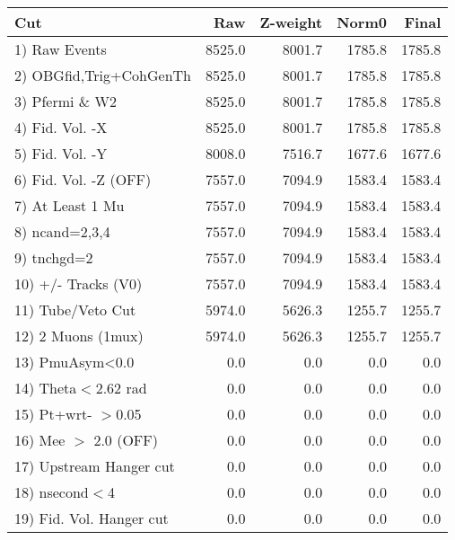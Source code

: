  \begin{table}[h!]\centering
 \begin{tabular}{||l||r|r|r|r||}
 \hline
 \hline
 Cut & Raw & Z-weight & Norm0 & Final \\
 \hline
  1) Raw Events           &      8525.0 &      8001.7 &      1785.8 &      1785.8 \\
  2) OBGfid,Trig+CohGenTh &      8525.0 &      8001.7 &      1785.8 &      1785.8 \\
  3) Pfermi \& W2         &      8525.0 &      8001.7 &      1785.8 &      1785.8 \\
  4) Fid. Vol. -X         &      8525.0 &      8001.7 &      1785.8 &      1785.8 \\
  5) Fid. Vol. -Y         &      8008.0 &      7516.7 &      1677.6 &      1677.6 \\
  6) Fid. Vol. -Z (OFF)   &      7557.0 &      7094.9 &      1583.4 &      1583.4 \\
  7) At Least 1 Mu        &      7557.0 &      7094.9 &      1583.4 &      1583.4 \\
  8) ncand=2,3,4          &      7557.0 &      7094.9 &      1583.4 &      1583.4 \\
  9) tnchgd=2             &      7557.0 &      7094.9 &      1583.4 &      1583.4 \\
 10) +/- Tracks (V0)      &      7557.0 &      7094.9 &      1583.4 &      1583.4 \\
 11) Tube/Veto Cut        &      5974.0 &      5626.3 &      1255.7 &      1255.7 \\
 12) 2 Muons (1mux)       &      5974.0 &      5626.3 &      1255.7 &      1255.7 \\
 13) PmuAsym<0.0          &         0.0 &         0.0 &         0.0 &         0.0 \\
 14) Theta$<$2.62 rad     &         0.0 &         0.0 &         0.0 &         0.0 \\
 15) Pt+wrt- $>$0.05      &         0.0 &         0.0 &         0.0 &         0.0 \\
 16) Mee $>$ 2.0  (OFF)   &         0.0 &         0.0 &         0.0 &         0.0 \\
 17) Upstream Hanger cut  &         0.0 &         0.0 &         0.0 &         0.0 \\
 18) nsecond$<$4          &         0.0 &         0.0 &         0.0 &         0.0 \\
 19) Fid. Vol. Hanger cut &         0.0 &         0.0 &         0.0 &         0.0 \\

\end{tabular}
\end{table}
